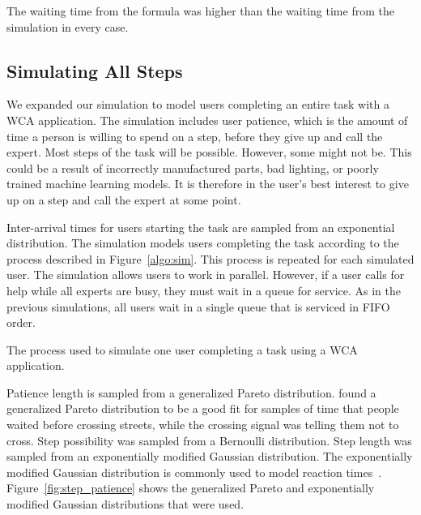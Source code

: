 The waiting time from the formula was higher than the waiting time from
the simulation in every case.

\subsection{Simulating All Steps}

We expanded our simulation to model users completing an entire task with a WCA
application.
The simulation includes user patience, which is the amount of time a person is
willing to spend on a step, before they give up and call the expert.
Most steps of the task will be possible.
However, some might not be.
This could be a result of incorrectly manufactured parts, bad lighting, or
poorly trained machine learning models.
It is therefore in the user's best interest to give up on a step and call the
expert at some point.

Inter-arrival times for users starting the task are sampled from an exponential
distribution.
The simulation models users completing the task according to the process
described in Figure~\ref{algo:sim}.
This process is repeated for each simulated user.
The simulation allows users to work in parallel.
However, if a user calls for help while all experts are busy, they must wait in
a queue for service.
As in the previous simulations, all users wait in a single queue that is
serviced in FIFO order.

\begin{algorithm}[h]
  \caption{
    The process used to simulate one user completing a task using a WCA
    application.
  }\label{algo:sim}
\end{algorithm}

Patience length is sampled from a generalized Pareto distribution.
\citet{patience} found a generalized Pareto distribution to be a good fit for
samples of time that people waited before crossing streets, while the crossing
signal was telling them not to cross.
Step possibility was sampled from a Bernoulli distribution.
Step length was sampled from an exponentially modified Gaussian distribution.
The exponentially modified Gaussian distribution is commonly used to model
reaction times~\cite{dawson1988fitting}.
Figure~\ref{fig:step_patience} shows the generalized Pareto and exponentially
modified Gaussian distributions that were used.

